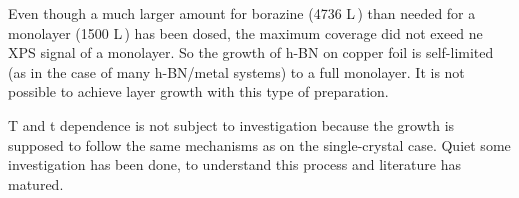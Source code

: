 Even though a much larger amount for borazine (4736 L\,) than needed for a monolayer (1500 L\,) has been dosed, the maximum coverage did not exeed ne XPS signal of a monolayer. So the growth of h-BN on copper foil is self-limited (as in the case of many h-BN/metal systems) to a full monolayer. It is not possible to achieve layer growth with this type of preparation.

T and t dependence is not subject to investigation because the growth is supposed to follow the same mechanisms as on the single-crystal case. Quiet some investigation has been done, \cite{orlando_epitaxial_2012,preobrajenski_monolayer_2007-1} to understand this process and literature has matured.